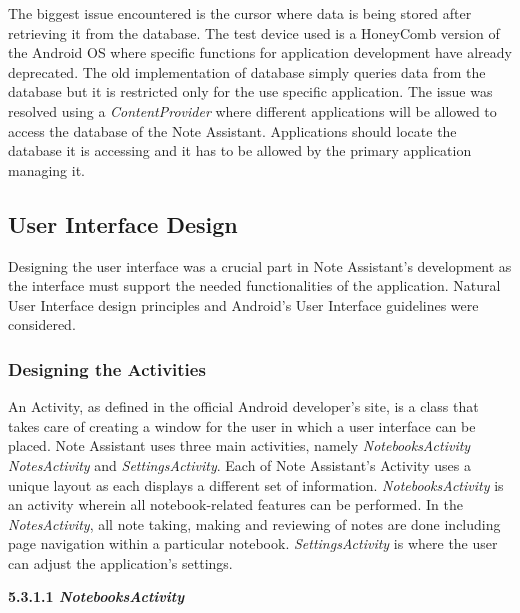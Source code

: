 	The biggest issue encountered is the cursor where data is being stored after retrieving it from the database. The test device used is a HoneyComb version of the Android OS where specific functions for application development have already deprecated. The old implementation of database simply queries data from the database but it is restricted only for the use specific application. The issue was resolved using a \textit{ContentProvider} where different applications will be allowed to access the database of the Note Assistant. Applications should locate the database it is accessing and it has to be allowed by the primary application managing it.

\subsection{User Interface Design}
\label{sec:userinterfacedesign}

Designing the user interface was a crucial part in Note Assistant's development as the interface must support the needed functionalities of the application. Natural User Interface design principles and Android's User Interface guidelines were considered.

\subsubsection{Designing the Activities}
\label{sec:designingtheactivities}

An Activity, as defined in the official Android developer's site, is a class that takes care of creating a window for the user in which a user interface can be placed. Note Assistant uses three main activities, namely \textit{NotebooksActivity} \textit{NotesActivity} and \textit{SettingsActivity}. Each of Note Assistant's Activity uses a unique layout as each displays a different set of information. \textit{NotebooksActivity} is an activity wherein all notebook-related features can be performed. In the \textit{NotesActivity}, all note taking, making and reviewing of notes are done including page navigation within a particular notebook. \textit{SettingsActivity} is where the user can adjust the application's settings.

\begin{flushleft}
\textbf{5.3.1.1 \textit{NotebooksActivity}}
\end{flushleft}

